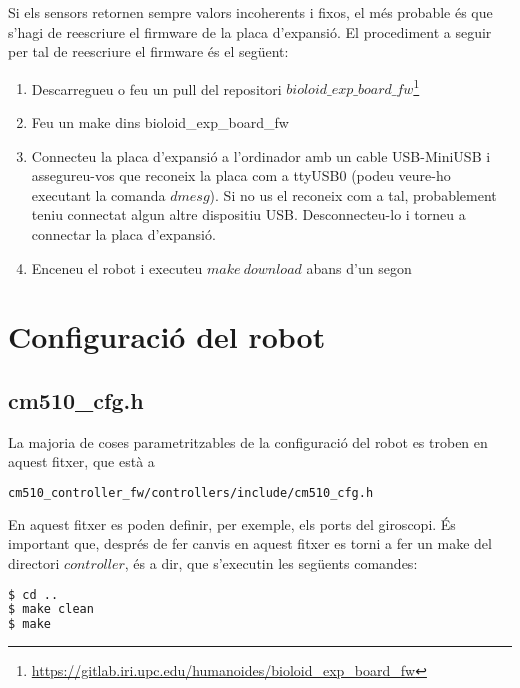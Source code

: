 \documentclass{article}
\begin{document}
Si els sensors retornen sempre valors incoherents i fixos, el més probable és que s'hagi de reescriure el firmware de la placa d'expansió. El procediment a seguir per tal de reescriure el firmware és el següent:

\begin{enumerate}
	\item Descarregueu o feu un pull del repositori $bioloid\_exp\_board\_fw$\footnote{\url{https://gitlab.iri.upc.edu/humanoides/bioloid_exp_board_fw}}
	\item Feu un make dins bioloid\_exp\_board\_fw
	\item Connecteu la placa d'expansió a l'ordinador amb un cable USB-MiniUSB i assegureu-vos que reconeix la placa com a ttyUSB0 (podeu veure-ho executant la comanda $dmesg$). Si no us el reconeix com a tal, probablement teniu connectat algun altre dispositiu USB. Desconnecteu-lo i torneu a connectar la placa d'expansió.
	\item Enceneu el robot i executeu $make\ download$ abans d'un segon 
\end{enumerate}


\section{Configuració del robot}
\subsection{cm510\_cfg.h}
La majoria de coses parametritzables de la configuració del robot es troben en aquest fitxer, que està a 
\begin{lstlisting}[language=bash]
cm510_controller_fw/controllers/include/cm510_cfg.h
\end{lstlisting}
En aquest fitxer es poden definir, per exemple, els ports del giroscopi.
És important que, després de fer canvis en aquest fitxer es torni a fer un make del directori $controller$, és a dir, que s'executin les següents comandes:
\begin{lstlisting}[language=bash]
$ cd ..
$ make clean
$ make
\end{lstlisting}
\end{document}
